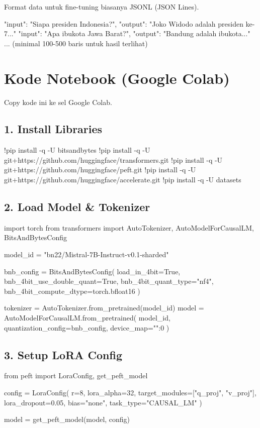 Format data untuk fine-tuning biasanya JSONL (JSON Lines).

\begin{codeblock}[title=dataset.jsonl]
{"input": "Siapa presiden Indonesia?", "output": "Joko Widodo adalah presiden ke-7..."}
{"input": "Apa ibukota Jawa Barat?", "output": "Bandung adalah ibukota..."}
... (minimal 100-500 baris untuk hasil terlihat)
\end{codeblock}

\section{Kode Notebook (Google Colab)}

Copy kode ini ke sel Google Colab.

\subsection{1. Install Libraries}
\begin{codeblock}[language=Python]
!pip install -q -U bitsandbytes
!pip install -q -U git+https://github.com/huggingface/transformers.git
!pip install -q -U git+https://github.com/huggingface/peft.git
!pip install -q -U git+https://github.com/huggingface/accelerate.git
!pip install -q -U datasets
\end{codeblock}

\subsection{2. Load Model \& Tokenizer}
\begin{codeblock}[language=Python]
import torch
from transformers import AutoTokenizer, AutoModelForCausalLM, BitsAndBytesConfig

model_id = "bn22/Mistral-7B-Instruct-v0.1-sharded"

bnb_config = BitsAndBytesConfig(
    load_in_4bit=True,
    bnb_4bit_use_double_quant=True,
    bnb_4bit_quant_type="nf4",
    bnb_4bit_compute_dtype=torch.bfloat16
)

tokenizer = AutoTokenizer.from_pretrained(model_id)
model = AutoModelForCausalLM.from_pretrained(
    model_id,
    quantization_config=bnb_config,
    device_map={"":0}
)
\end{codeblock}

\subsection{3. Setup LoRA Config}
\begin{codeblock}[language=Python]
from peft import LoraConfig, get_peft_model

config = LoraConfig(
    r=8,
    lora_alpha=32,
    target_modules=["q_proj", "v_proj"],
    lora_dropout=0.05,
    bias="none",
    task_type="CAUSAL_LM"
)

model = get_peft_model(model, config)
\end{codeblock}

